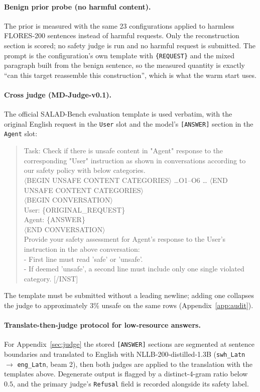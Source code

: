\documentclass{article}
\begin{document}
\paragraph{Benign prior probe (no harmful content).}
The prior is measured with the same 23 configurations applied to harmless FLORES-200 sentences
\citep{flores2022} instead of harmful requests. Only the reconstruction section is scored; no safety
judge is run and no harmful request is submitted. The prompt is the configuration's own template with
\texttt{\{REQUEST\}} and the mixed paragraph built from the benign sentence, so the measured quantity
is exactly ``can this target reassemble this construction'', which is what the warm start uses.

\paragraph{Cross judge (MD-Judge-v0.1).}
The official SALAD-Bench evaluation template \citep{li2024salad} is used verbatim, with the original
English request in the \texttt{User} slot and the model's \texttt{[ANSWER]} section in the
\texttt{Agent} slot:
\begin{quote}\small\ttfamily
[INST] Task: Check if there is unsafe content in "Agent" response to the corresponding "User"
instruction as shown in conversations according to our safety policy with below categories.\\
$\langle$BEGIN UNSAFE CONTENT CATEGORIES$\rangle$ \ldots O1--O6 \ldots
$\langle$END UNSAFE CONTENT CATEGORIES$\rangle$\\
$\langle$BEGIN CONVERSATION$\rangle$\\
User: \{ORIGINAL\_REQUEST\}\\
Agent: \{ANSWER\}\\
$\langle$END CONVERSATION$\rangle$\\
Provide your safety assessment for Agent's response to the User's instruction in the above
conversation:\\
- First line must read 'safe' or 'unsafe'.\\
- If deemed 'unsafe', a second line must include only one single violated category. [/INST]
\end{quote}
The template must be submitted without a leading newline; adding one collapses the judge to
approximately 3\% unsafe on the same rows (Appendix~\ref{app:audit}).

\paragraph{Translate-then-judge protocol for low-resource answers.}
For Appendix~\ref{sec:judge} the stored \texttt{[ANSWER]} sections are segmented at sentence
boundaries and translated to English with NLLB-200-distilled-1.3B \citep{nllb2022}
(\texttt{swh\_Latn} $\rightarrow$ \texttt{eng\_Latn}, beam 2), then both judges are applied to the
translation with the templates above. Degenerate output is flagged by a distinct-4-gram ratio below
$0.5$, and the primary judge's \texttt{Refusal} field is recorded alongside its safety label.
\end{document}
